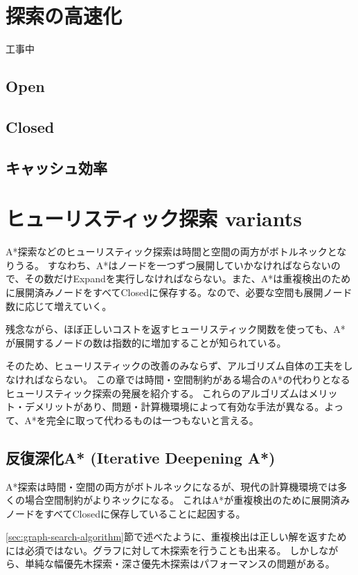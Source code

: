 \documentclass{report}
\begin{document}
\chapter{探索の高速化}
\label{ch:search-performance}
工事中
\section{Open}
\section{Closed}
\section{キャッシュ効率}


\chapter{ヒューリスティック探索 variants}
\label{ch:heuristic-serach-variants}
A*探索などのヒューリスティック探索は時間と空間の両方がボトルネックとなりうる。
すなわち、A*はノードを一つずつ展開していかなければならないので、その数だけExpandを実行しなければならない。また、A*は重複検出のために展開済みノードをすべてClosedに保存する。なので、必要な空間も展開ノード数に応じて増えていく。

残念ながら、ほぼ正しいコストを返すヒューリスティック関数を使っても、A*が展開するノードの数は指数的に増加することが知られている\cite{}。

そのため、ヒューリスティックの改善のみならず、アルゴリズム自体の工夫をしなければならない。
この章では時間・空間制約がある場合のA*の代わりとなるヒューリスティック探索の発展を紹介する。
これらのアルゴリズムはメリット・デメリットがあり、問題・計算機環境によって有効な手法が異なる。よって、A*を完全に取って代わるものは一つもないと言える。

\section{反復深化A* (Iterative Deepening A*)}
\label{sec:iterative-deepening-astar}

A*探索は時間・空間の両方がボトルネックになるが、現代の計算機環境では多くの場合空間制約がよりネックになる。
これはA*が重複検出のために展開済みノードをすべてClosedに保存していることに起因する。

\ref{sec:graph-search-algorithm}節で述べたように、重複検出は正しい解を返すためには必須ではない。グラフに対して木探索を行うことも出来る。
しかしながら、単純な幅優先木探索・深さ優先木探索はパフォーマンスの問題がある。
\end{document}
